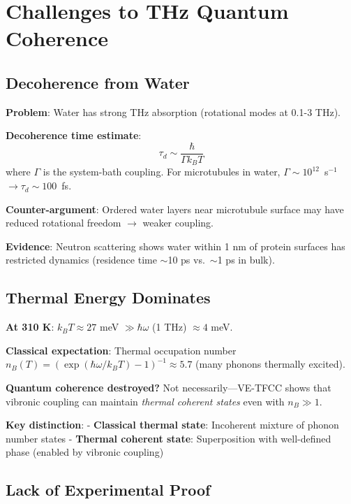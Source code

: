 \section{Challenges to THz Quantum Coherence}\label{challenges-to-thz-quantum-coherence}

\subsection{Decoherence from Water}\label{decoherence-from-water}

\textbf{Problem}: Water has strong THz absorption (rotational modes at
0.1-3 THz).

\textbf{Decoherence time estimate}:
\begin{equation}
\label{eq:decoherence-time}
\tau_d \sim \frac{\hbar}{\Gamma k_B T}
\end{equation}
where $\Gamma$ is the system-bath coupling. For microtubules in water, $\Gamma \sim 10^{12}$~s$^{-1}$ $\rightarrow \tau_d \sim 100$~fs.

\textbf{Counter-argument}: Ordered water layers near microtubule surface may have reduced rotational freedom $\rightarrow$ weaker coupling.

\textbf{Evidence}: Neutron scattering shows water within 1 nm of protein
surfaces has restricted dynamics (residence time $\sim$10 ps
vs.~$\sim$1 ps in bulk).

\subsection{Thermal Energy Dominates}\label{thermal-energy-dominates}

\textbf{At 310 K}: $k_B T \approx 27$ meV $\gg \hbar \omega$ (1 THz) $\approx 4$ meV.

\textbf{Classical expectation}: Thermal occupation number $n_B(T) = (\exp(\hbar \omega / k_B T) - 1)^{-1} \approx 5.7$ (many phonons thermally excited).

\textbf{Quantum coherence destroyed?} Not necessarily---VE-TFCC shows that vibronic coupling can maintain \emph{thermal coherent states} even with $n_B \gg 1$.

\textbf{Key distinction}: - \textbf{Classical thermal state}: Incoherent
mixture of phonon number states - \textbf{Thermal coherent state}:
Superposition with well-defined phase (enabled by vibronic coupling)

\subsection{Lack of Experimental Proof}\label{lack-of-experimental-proof}

